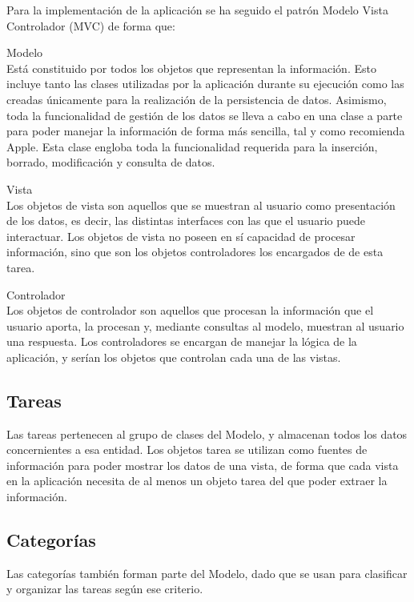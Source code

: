 \documentclass[parskip=half*]{scrartcl}
\begin{document}
Para la implementación de la aplicación se ha seguido el patrón Modelo Vista Controlador (MVC) de forma que:

	\item[Modelo] \hfill \\ Está constituido por todos los objetos que representan la información. Esto incluye tanto las clases utilizadas por la aplicación durante su ejecución como las creadas únicamente para la realización de la persistencia de datos. Asimismo, toda la funcionalidad de gestión de los datos se lleva a cabo en una clase a parte para poder manejar la información de forma más sencilla, tal y como recomienda Apple. Esta clase engloba toda la funcionalidad requerida para la inserción, borrado, modificación y consulta de datos.
	\item[Vista] \hfill \\ Los objetos de vista son aquellos que se muestran al usuario como presentación de los datos, es decir, las distintas interfaces con las que el usuario puede interactuar. Los objetos de vista no poseen en sí capacidad de procesar información, sino que son los objetos controladores los encargados de de esta tarea.
	\item[Controlador] \hfill \\ Los objetos de controlador son aquellos que procesan la información que el usuario aporta, la procesan y, mediante consultas al modelo, muestran al usuario una respuesta. Los controladores se encargan de manejar la lógica de la aplicación, y serían los objetos que controlan cada una de las vistas.

\subsection{Tareas}

Las tareas pertenecen al grupo de clases del Modelo, y almacenan todos los datos concernientes a esa entidad. Los objetos tarea se utilizan como fuentes de información para poder mostrar los datos de una vista, de forma que cada vista en la aplicación necesita de al menos un objeto tarea del que poder extraer la información.

\subsection{Categor\'ias}

Las categorías también forman parte del Modelo, dado que se usan para clasificar y organizar las tareas según ese criterio.
\end{document}
